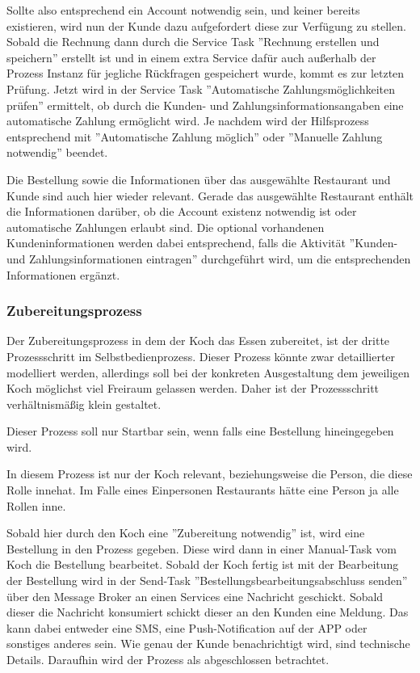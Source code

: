 Sollte also entsprechend ein Account notwendig sein, und keiner bereits existieren, wird nun der Kunde dazu aufgefordert diese zur Verfügung zu stellen. Sobald die Rechnung dann durch die Service Task ''Rechnung erstellen und speichern'' erstellt ist und in einem extra Service dafür auch außerhalb der Prozess Instanz für jegliche Rückfragen gespeichert wurde, kommt es zur letzten Prüfung. Jetzt wird in der Service Task  ''Automatische Zahlungsmöglichkeiten prüfen'' ermittelt, ob durch die Kunden- und Zahlungsinformationsangaben eine automatische Zahlung ermöglicht wird. Je nachdem wird der Hilfsprozess entsprechend mit ''Automatische Zahlung möglich'' oder ''Manuelle Zahlung notwendig'' beendet.

Die Bestellung sowie die Informationen über das ausgewählte Restaurant und Kunde sind auch hier wieder relevant. Gerade das ausgewählte Restaurant enthält die Informationen darüber, ob die Account existenz notwendig ist oder automatische Zahlungen erlaubt sind. Die optional vorhandenen Kundeninformationen werden dabei entsprechend, falls die Aktivität ''Kunden- und Zahlungsinformationen eintragen'' durchgeführt wird, um die entsprechenden Informationen ergänzt.

\subsubsection{Zubereitungsprozess}
Der Zubereitungsprozess in dem der Koch das Essen zubereitet, ist der dritte Prozessschritt im Selbstbedienprozess. Dieser Prozess könnte zwar detaillierter modelliert werden, allerdings soll bei der konkreten Ausgestaltung dem jeweiligen Koch möglichst viel Freiraum gelassen werden. Daher ist der Prozessschritt verhältnismäßig klein gestaltet.

Dieser Prozess soll nur Startbar sein, wenn falls eine Bestellung hineingegeben wird.

In diesem Prozess ist nur der Koch relevant, beziehungsweise die Person, die diese Rolle innehat. Im Falle eines Einpersonen Restaurants hätte eine Person ja alle Rollen inne.



Sobald hier durch den Koch eine ''Zubereitung notwendig'' ist, wird eine Bestellung in den Prozess gegeben. Diese wird dann in einer Manual-Task vom Koch die Bestellung bearbeitet. Sobald der Koch fertig ist mit der Bearbeitung der Bestellung wird in der Send-Task ''Bestellungsbearbeitungsabschluss senden'' über den Message Broker an einen Services eine Nachricht geschickt. Sobald dieser die Nachricht konsumiert schickt dieser an den Kunden eine Meldung. Das kann dabei entweder eine SMS, eine Push-Notification auf der APP oder sonstiges anderes sein. Wie genau der Kunde benachrichtigt wird, sind technische Details. Daraufhin wird der Prozess als abgeschlossen betrachtet.

